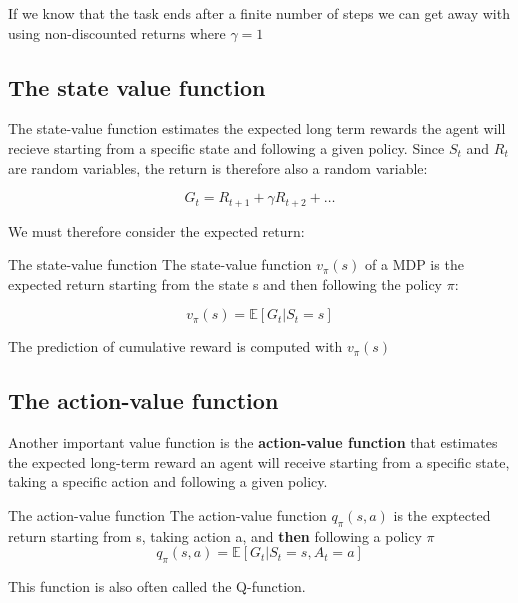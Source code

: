 If we know that the task ends after a finite number of steps we can get away with using non-discounted returns where $\gamma = 1$

\subsection*{The state value function}
The state-value function estimates the expected long term rewards the agent will recieve starting from a specific state and following a given policy. Since $S_t$ and $R_t$ are random variables, the return is therefore also a random variable:

	\begin{equation}
		G_t = R_{t+1} + \gamma R_{t+2} + \ldots
	\nonumber
	\end{equation}

We must therefore consider the expected return:

	\begin{wbox}{The state-value function}
	The state-value function $v_\pi (s)$ of a MDP is the expected return starting from the state s and then following the policy $\pi$:

		\begin{equation}
			v_\pi (s) = \mathbb{E}[G_t | S_t = s]
		\end{equation}
	\end{wbox}

The prediction of cumulative reward is computed with $v_\pi(s)$



\subsection*{The action-value function}
Another important value function is the \textbf{action-value function} that estimates the expected long-term reward an agent will receive starting from a specific state, taking a specific action and following a given policy.

	\begin{wbox}{The action-value function}
	The action-value function $q_\pi(s,a)$ is the exptected return starting from s, taking action a, and \textbf{then} following a policy $\pi$
		\begin{equation}
			q_\pi (s,a) = \mathbb{E}[G_t | S_t = s, A_t = a]
		\end{equation}
	\end{wbox}

This function is also often called the Q-function. 

